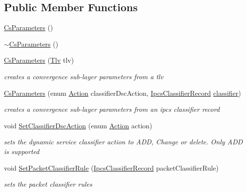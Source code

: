 \subsection*{Public Member Functions}
\begin{DoxyCompactItemize}
\item 
\hyperlink{classns3_1_1CsParameters_af99dbdc5a6d50c09d0da9d761473ac22}{Cs\+Parameters} ()
\item 
\hyperlink{classns3_1_1CsParameters_af9263b31eb9068426aa497c0a83f2766}{$\sim$\+Cs\+Parameters} ()
\item 
\hyperlink{classns3_1_1CsParameters_a160269d8928bf8aaf2ad3a883ea491b2}{Cs\+Parameters} (\hyperlink{classns3_1_1Tlv}{Tlv} tlv)
\begin{DoxyCompactList}\small\item\em creates a convergence sub-\/layer parameters from a tlv \end{DoxyCompactList}\item 
\hyperlink{classns3_1_1CsParameters_aaca1294206568f6f0cac667acd5c3565}{Cs\+Parameters} (enum \hyperlink{classns3_1_1CsParameters_a0d81108fb3effa0924cf6c34adabb99b}{Action} classifier\+Dsc\+Action, \hyperlink{classns3_1_1IpcsClassifierRecord}{Ipcs\+Classifier\+Record} \hyperlink{design_8txt_af9e6b398b148789960232a87c72a107e}{classifier})
\begin{DoxyCompactList}\small\item\em creates a convergence sub-\/layer parameters from an ipcs classifier record \end{DoxyCompactList}\item 
void \hyperlink{classns3_1_1CsParameters_ab9d00129bc8bee23dbf4f299b813d479}{Set\+Classifier\+Dsc\+Action} (enum \hyperlink{classns3_1_1CsParameters_a0d81108fb3effa0924cf6c34adabb99b}{Action} action)
\begin{DoxyCompactList}\small\item\em sets the dynamic service classifier action to A\+DD, Change or delete. Only A\+DD is supported \end{DoxyCompactList}\item 
void \hyperlink{classns3_1_1CsParameters_af624f114940e98deacc5241d03dbd5d6}{Set\+Packet\+Classifier\+Rule} (\hyperlink{classns3_1_1IpcsClassifierRecord}{Ipcs\+Classifier\+Record} packet\+Classifier\+Rule)
\begin{DoxyCompactList}\small\item\em sets the packet classifier rules \end{DoxyCompactList}\item 

\end{DoxyCompactItemize}
